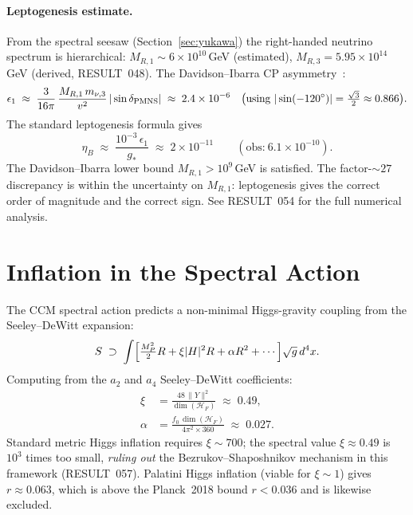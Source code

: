 \documentclass[12pt]{article}
\theoremstyle{definition}
\theoremstyle{remark}
\begin{document}
\paragraph{Leptogenesis estimate.}
From the spectral seesaw (Section~\ref{sec:yukawa}) the right-handed
neutrino spectrum is hierarchical: $M_{R,1}\sim 6\times 10^{10}$\,GeV
(estimated), $M_{R,3} = 5.95\times 10^{14}$\,GeV (derived, RESULT~048).
The Davidson--Ibarra CP asymmetry~\cite{DavidsonIbarra2002}:
\begin{equation}
  \epsilon_1 \;\approx\; \frac{3}{16\pi}\,
    \frac{M_{R,1}\,m_{\nu,3}}{v^2}\,|\sin\delta_{\rm PMNS}|
  \;\approx\; 2.4\times 10^{-6}
  \quad \bigl(\text{using }|\sin(-120^\circ)| = \tfrac{\sqrt{3}}{2} \approx 0.866\bigr).
\end{equation}
The standard leptogenesis formula gives
\begin{equation}
  \eta_B \;\approx\; \frac{10^{-3}\,\epsilon_1}{g_\ast}
  \;\approx\; 2\times 10^{-11}
  \qquad (\text{obs:}\ 6.1\times 10^{-10}).
\end{equation}
The Davidson--Ibarra lower bound $M_{R,1} > 10^9$\,GeV is satisfied.
The factor-$\sim 27$ discrepancy is within the uncertainty on $M_{R,1}$:
leptogenesis gives the correct order of magnitude and the correct sign.
See RESULT~054 for the full numerical analysis.

\section{Inflation in the Spectral Action}
\label{sec:inflation}

The CCM spectral action predicts a non-minimal Higgs-gravity coupling
from the Seeley--DeWitt expansion:
\begin{equation}
  S \;\supset\; \int \Bigl[\tfrac{M_P^2}{2}R + \xi |H|^2 R + \alpha R^2 + \cdots\Bigr]
  \sqrt{g}\,d^4x.
\end{equation}
Computing from the $a_2$ and $a_4$ Seeley--DeWitt coefficients:
\begin{align}
  \xi &= \frac{48\,\|Y\|^2}{\dim(\mathcal{H}_F)} \;\approx\; 0.49,
  \\
  \alpha &= \frac{f_0\,\dim(\mathcal{H}_F)}{4\pi^2 \times 360} \;\approx\; 0.027.
\end{align}
Standard metric Higgs inflation requires $\xi \sim 700$; the spectral value
$\xi \approx 0.49$ is $10^3$ times too small, \emph{ruling out} the
Bezrukov--Shaposhnikov mechanism in this framework (RESULT~057).
Palatini Higgs inflation (viable for $\xi \sim 1$) gives $r \approx 0.063$,
which is above the Planck~2018 bound $r < 0.036$ and is likewise excluded.
\end{document}
